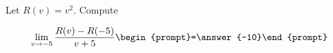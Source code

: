 \documentclass{ximera}
\author{Bart Snapp}
\begin{document}
\begin{exercise}
Let $R(v) = v^2$. Compute

\[
\lim_{ v\to -5 } 
\frac{R(v)-R(-5)}{v+5} \begin{prompt}=\answer{-10}\end{prompt}
\]
\end{exercise}
\end{document}
